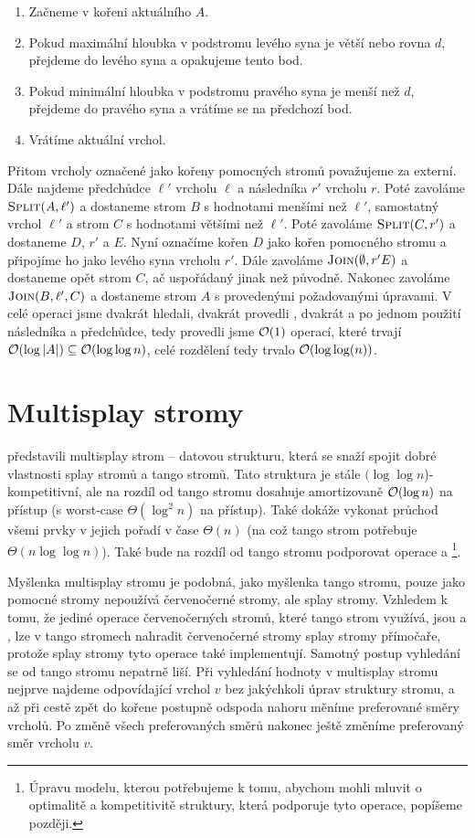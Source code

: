 \begin{enumerate}
\item Začneme v kořeni aktuálního $A$.
\item Pokud maximální hloubka v podstromu levého syna je větší nebo rovna $d$, přejdeme do levého syna a opakujeme tento bod.
\item Pokud minimální hloubka v podstromu pravého syna je menší než $d$, přejdeme do pravého syna a vrátíme se na předchozí bod.
\item Vrátíme aktuální vrchol.
\end{enumerate}

Přitom vrcholy označené jako kořeny pomocných stromů považujeme za externí.
Dále najdeme předchůdce $\ell'$ vrcholu $\ell$ a následníka $r'$ vrcholu $r$. Poté zavoláme
$\ope{Split}(A, \ell')$ a dostaneme strom $B$ s hodnotami menšími než $\ell'$,
samostatný vrchol $\ell'$ a strom $C$ s hodnotami většími než $\ell'$. Poté
zavoláme $\ope{Split}(C,r')$ a dostaneme $D$, $r'$ a $E$. Nyní označíme kořen
$D$ jako kořen pomocného stromu a připojíme ho jako levého syna vrcholu $r'$.
Dále zavoláme $\ope{Join}(\emptyset, r' E)$ a dostaneme opět strom $C$, ač
uspořádaný jinak než původně. Nakonec zavoláme $\ope{Join}(B,\ell',C)$ a
dostaneme strom $A$ s provedenými požadovanými úpravami. V celé operaci jsme
dvakrát hledali, dvakrát provedli , dvakrát  a po jednom
použití následníka a předchůdce, tedy provedli jsme $\mathcal O(1)$ operací, které
trvají $\mathcal O(\log |A|)\subseteq \mathcal O(\log\log n)$, celé rozdělení tedy trvalo
$\mathcal O(\log\log(n))$.


\section{Multisplay stromy}

\citet{multisplay} představili multisplay strom -- datovou strukturu, která se
snaží spojit dobré vlastnosti splay stromů a tango stromů. Tato struktura je
stále $(\log\log n$)-kompetitivní, ale na rozdíl od tango stromu dosahuje
amortizovaně $\mathcal O(\log n)$ na přístup (s worst-case $\Theta(\log^2 n)$ na
přístup). Také dokáže vykonat průchod všemi prvky v jejich pořadí v čase
$\Theta(n)$ (na což tango strom potřebuje $\Theta(n\log\log n)$). Také bude na rozdíl
od tango stromu podporovat operace  a \footnote{Úpravu modelu,
kterou potřebujeme k tomu, abychom mohli mluvit o optimalitě a kompetitivitě
struktury, která podporuje tyto operace, popíšeme později.}.

Myšlenka multisplay stromu je podobná, jako myšlenka tango stromu, pouze jako
pomocné stromy nepoužívá červenočerné stromy, ale splay stromy. Vzhledem k
tomu, že jediné operace červenočerných stromů, které tango strom využívá, jsou
 a , lze v tango stromech nahradit červenočerné stromy
splay stromy přímočaře, protože splay stromy tyto operace také implementují.
Samotný postup vyhledání se od tango stromu nepatrně liší. Při vyhledání
hodnoty v multisplay stromu nejprve najdeme odpovídající vrchol $v$ bez
jakýchkoli úprav struktury stromu, a až při cestě zpět do kořene postupně
odspoda nahoru měníme preferované směry vrcholů. Po změně všech preferovaných
směrů nakonec ještě změníme preferovaný směr vrcholu $v$.

